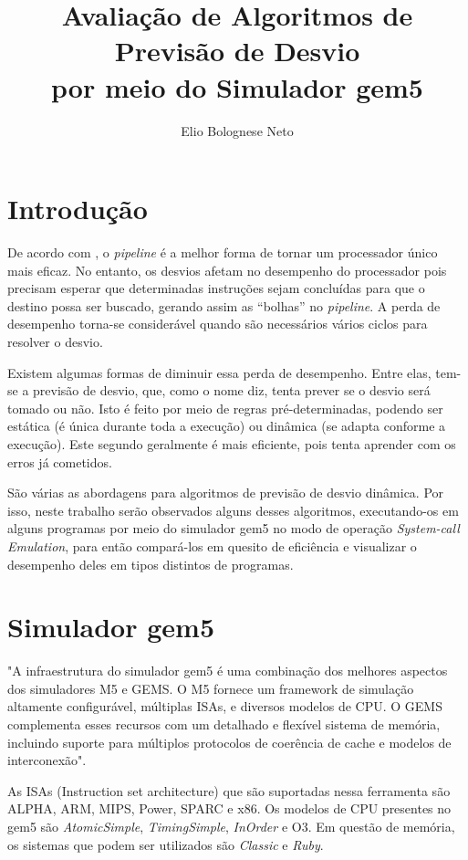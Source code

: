 \documentclass[12pt]{article}
\title{Avaliação de Algoritmos de Previsão de Desvio\\por meio do Simulador gem5}
\author{Elio Bolognese Neto\inst{1}}
\begin{document}
 

\maketitle

\section{Introdução}

De acordo com \cite{yeh1991two}, o \textit{pipeline} é a melhor forma de tornar um processador único mais eficaz. No entanto, os desvios afetam no desempenho do processador pois precisam esperar que determinadas instruções sejam concluídas para que o destino possa ser buscado, gerando assim as “bolhas” no \textit{pipeline}. A perda de desempenho torna-se considerável quando são necessários vários ciclos para resolver o desvio.

Existem algumas formas de diminuir essa perda de desempenho. Entre elas, tem-se a previsão de desvio, que, como o nome diz, tenta prever se o desvio será tomado ou não. Isto é feito por meio de regras pré-determinadas, podendo ser estática (é única durante toda a execução) ou dinâmica (se adapta conforme a execução). Este segundo geralmente é mais eficiente, pois tenta aprender com os erros já cometidos.

São várias as abordagens para algoritmos de previsão de desvio dinâmica. Por isso, neste trabalho serão observados alguns desses algoritmos, executando-os em alguns programas por meio do simulador gem5 no modo de operação \textit{System-call Emulation}, para então compará-los em quesito de eficiência e visualizar o desempenho deles em tipos distintos de programas.

\section{Simulador gem5}
	
"A infraestrutura do simulador gem5 é uma combinação dos melhores aspectos dos simuladores M5 e GEMS. O M5 fornece um framework de simulação altamente configurável, múltiplas ISAs, e diversos modelos de CPU. O GEMS complementa esses recursos com um detalhado e flexível sistema de memória, incluindo suporte para múltiplos protocolos de coerência de cache e modelos de interconexão"\cite{binkert2011gem5}.

As ISAs (Instruction set architecture) que são suportadas nessa ferramenta são ALPHA, ARM, MIPS, Power, SPARC e x86. Os modelos de CPU presentes no gem5 são \textit{AtomicSimple}, \textit{TimingSimple}, \textit{InOrder} e O3. Em questão de memória, os sistemas que podem ser utilizados são \textit{Classic} e \textit{Ruby}.
\end{document}

